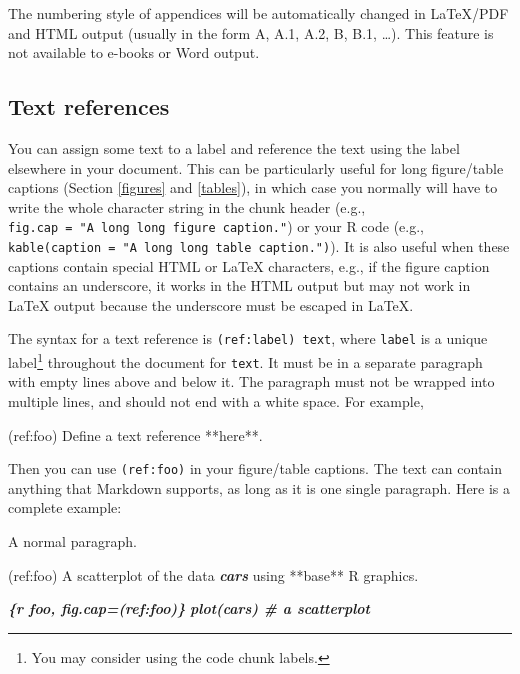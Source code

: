 \documentclass[
  12pt,
]{krantz}
\newenvironment{Shaded}{\begin{snugshade}}{\end{snugshade}}
\newcommand{\InformationTok}[1]{\textcolor[rgb]{0.56,0.35,0.01}{\textbf{\textit{#1}}}}
\newcommand{\NormalTok}[1]{#1}
\theoremstyle{definition}
\theoremstyle{definition}
\theoremstyle{definition}
\theoremstyle{definition}
\theoremstyle{remark}
\begin{document}
The numbering style of appendices will be automatically changed in LaTeX/PDF and HTML output (usually in the form A, A.1, A.2, B, B.1, \ldots). This feature is not available to e-books or Word output.

\hypertarget{text-references}{%
\subsection{Text references}\label{text-references}}

You can assign some text to a label and reference the text using the label elsewhere in your document. This can be particularly useful for long figure/table captions (Section \ref{figures} and \ref{tables}), in which case you normally will have to write the whole character string in the chunk header (e.g., \texttt{fig.cap\ =\ "A\ long\ long\ figure\ caption."}) or your R code (e.g., \texttt{kable(caption\ =\ "A\ long\ long\ table\ caption.")}). It is also useful when these captions contain special HTML or LaTeX characters, e.g., if the figure caption contains an underscore, it works in the HTML output but may not work in LaTeX output because the underscore must be escaped in LaTeX.

The syntax for a text reference is \texttt{(ref:label)\ text}, where \texttt{label} is a unique label\footnote{You may consider using the code chunk labels.} throughout the document for \texttt{text}. It must be in a separate paragraph with empty lines above and below it. The paragraph must not be wrapped into multiple lines, and should not end with a white space. For example,

\begin{Shaded}
\begin{Highlighting}[]
\NormalTok{(ref:foo) Define a text reference **here**. }
\end{Highlighting}
\end{Shaded}

Then you can use \texttt{(ref:foo)} in your figure/table captions. The text can contain anything that Markdown supports, as long as it is one single paragraph. Here is a complete example:

\begin{Shaded}
\begin{Highlighting}[]
\NormalTok{A normal paragraph.}

\NormalTok{(ref:foo) A scatterplot of the data }\InformationTok{\textasciigrave{}cars\textasciigrave{}}\NormalTok{ using **base** R graphics. }

\InformationTok{\textasciigrave{}\textasciigrave{}\textasciigrave{}\{r foo, fig.cap=\textquotesingle{}(ref:foo)\textquotesingle{}\}}
\InformationTok{plot(cars)  \# a scatterplot}
\InformationTok{\textasciigrave{}\textasciigrave{}\textasciigrave{}}
\end{Highlighting}
\end{Shaded}
\end{document}
